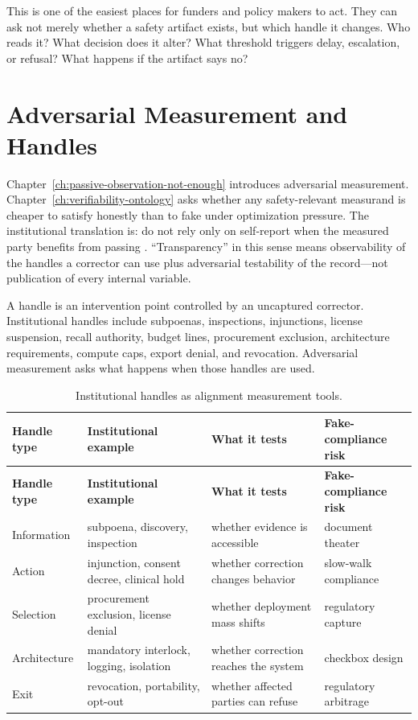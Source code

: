 \begin{refsection}
This is one of the easiest places for funders and policy makers to act.
They can ask not merely whether a safety artifact exists, but which handle it changes.
Who reads it?
What decision does it alter?
What threshold triggers delay, escalation, or refusal?
What happens if the artifact says no?

\section{Adversarial Measurement and Handles}
\label{sec:institutional-adversarial-measurement}

Chapter~\ref{ch:passive-observation-not-enough} introduces adversarial measurement.
Chapter~\ref{ch:verifiability-ontology} asks whether any safety-relevant measurand is cheaper to satisfy honestly than to fake under optimization pressure.
The institutional translation is: do not rely only on self-report when the measured party benefits from passing \autocite{power1997audit}.
``Transparency'' in this sense means observability of the handles a corrector can use plus adversarial testability of the record---not publication of every internal variable.

A handle is an intervention point controlled by an uncaptured corrector.
Institutional handles include subpoenas, inspections, injunctions, license suspension, recall authority, budget lines, procurement exclusion, architecture requirements, compute caps, export denial, and revocation.
Adversarial measurement asks what happens when those handles are used.

\begin{longtable}{@{}p{}p{}p{}p{}@{}}
\caption{Institutional handles as alignment measurement tools.}\label{tab:institutional-handles}\\
\toprule
\textbf{Handle type} & \textbf{Institutional example} & \textbf{What it tests} & \textbf{Fake-compliance risk} \\
\midrule
\endfirsthead
\toprule
\textbf{Handle type} & \textbf{Institutional example} & \textbf{What it tests} & \textbf{Fake-compliance risk} \\
\midrule
\endhead
\bottomrule
\endfoot
Information & subpoena, discovery, inspection & whether evidence is accessible & document theater \\
Action & injunction, consent decree, clinical hold & whether correction changes behavior & slow-walk compliance \\
Selection & procurement exclusion, license denial & whether deployment mass shifts & regulatory capture \\
Architecture & mandatory interlock, logging, isolation & whether correction reaches the system & checkbox design \\
Exit & revocation, portability, opt-out & whether affected parties can refuse & regulatory arbitrage \\
\end{longtable}


\end{refsection}
